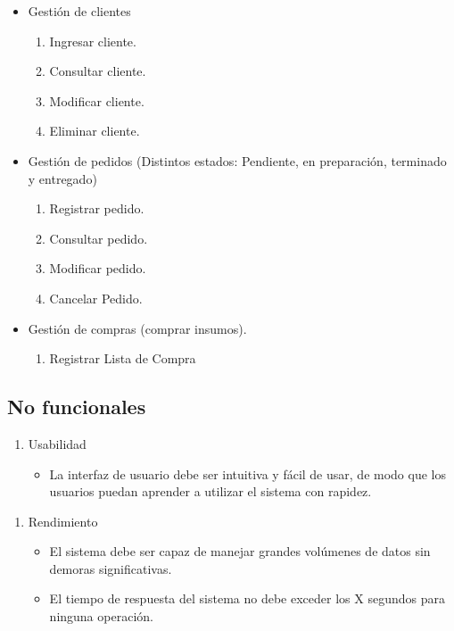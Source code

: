 \documentclass{article}
\begin{document}
\begin{itemize}
	\item Gestión de clientes
	\begin{enumerate}[start=17]
		\item Ingresar cliente.
		\item Consultar cliente.
		\item Modificar cliente.
		\item Eliminar cliente.
	\end{enumerate}
\end{itemize}

\begin{itemize}
	\item Gestión de pedidos (Distintos estados: Pendiente, en preparación, terminado y entregado)
	\begin{enumerate}[start=21]
		\item Registrar pedido.
		\item Consultar pedido.
		\item Modificar pedido.
		\item Cancelar Pedido.
	\end{enumerate}
\end{itemize}

\begin{itemize}
	\item Gestión de compras (comprar insumos).
	\begin{enumerate}[start=25]
		\item Registrar Lista de Compra
	\end{enumerate}
\end{itemize}

\subsection{No funcionales}
\begin{enumerate}
	\item Usabilidad
	\begin{itemize}
		\item La interfaz de usuario debe ser intuitiva y fácil de usar, de modo que los usuarios puedan aprender a utilizar el sistema con rapidez.
	\end{itemize}
\end{enumerate}

\begin{enumerate}[start=2]
	\item Rendimiento
	\begin{itemize}
		\item El sistema debe ser capaz de manejar grandes volúmenes de datos sin demoras significativas.
		\item El tiempo de respuesta del sistema no debe exceder los X segundos para ninguna operación.
	\end{itemize}
\end{enumerate}
\end{document}
